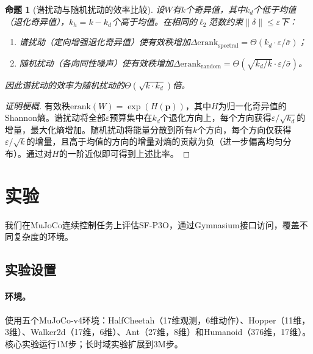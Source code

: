 \documentclass[twocolumn]{article}
\newtheorem{proposition}{\bf 命题}
\newcommand{\erank}{\mathrm{erank}}
\begin{document}
\begin{proposition}[谱扰动与随机扰动的效率比较]
\label{prop:efficiency}
设$W$有$k$个奇异值，其中$k_d$个低于均值（退化奇异值），$k_h = k - k_d$个高于均值。在相同的$\ell_2$范数约束$\|\delta\| \leq \varepsilon$下：
\begin{enumerate}[leftmargin=*]
    \item 谱扰动（定向增强退化奇异值）使有效秩增加$\Delta\erank_{\text{spectral}} = \Theta(k_d \cdot \varepsilon / \bar{\sigma})$；
    \item 随机扰动（各向同性噪声）使有效秩增加$\Delta\erank_{\text{random}} = \Theta(\sqrt{k_d/k} \cdot \varepsilon / \bar{\sigma})$。
\end{enumerate}
因此谱扰动的效率为随机扰动的$\Theta(\sqrt{k \cdot k_d})$倍。
\end{proposition}

\begin{proof}[证明梗概]
有效秩$\erank(W) = \exp(H(\mathbf{p}))$，其中$H$为归一化奇异值的Shannon熵。谱扰动将全部$\varepsilon$预算集中在$k_d$个退化方向上，每个方向获得$\varepsilon/\sqrt{k_d}$的增量，最大化熵增加。随机扰动将能量分散到所有$k$个方向，每个方向仅获得$\varepsilon/\sqrt{k}$的增量，且高于均值的方向的增量对熵的贡献为负（进一步偏离均匀分布）。通过对$H$的一阶近似即可得到上述比率。
\end{proof}


\section{实验}
\label{sec:experiments}

我们在MuJoCo\cite{todorov2012mujoco}连续控制任务上评估SF-P3O，通过Gymnasium\cite{towers2024gymnasium}接口访问，覆盖不同复杂度的环境。

\subsection{实验设置}

\paragraph{环境。}
使用五个MuJoCo-v4环境：HalfCheetah（17维观测，6维动作）、Hopper（11维，3维）、Walker2d（17维，6维）、Ant（27维，8维）和Humanoid（376维，17维）。核心实验运行1M步；长时域实验扩展到3M步。
\end{document}

